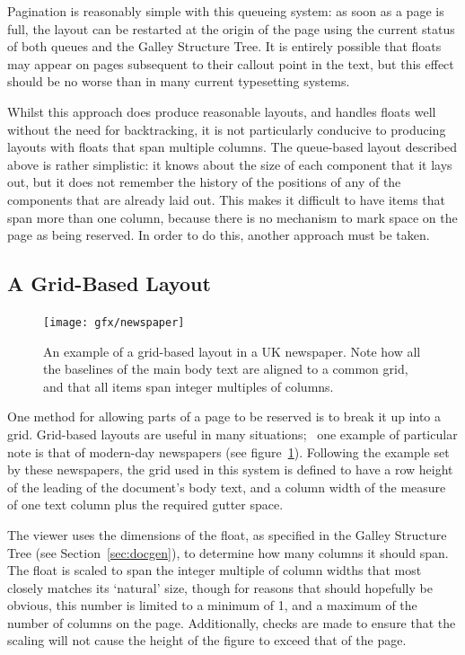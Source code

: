 Pagination is reasonably simple with this queueing system: as soon as a page is full, the layout can be restarted at the origin of the page using the current status of both queues and the Galley Structure Tree. It is entirely possible that floats may appear on pages subsequent to their callout point in the text, but this effect should be no worse than in many current typesetting systems.

Whilst this approach does produce reasonable layouts, and handles floats well without the need for backtracking, it is not particularly conducive to producing layouts with floats that span multiple columns. The queue-based layout described above is rather simplistic: it knows about the size of each component that it lays out, but it does not remember the history of the positions of any of the components that are already laid out. This makes it difficult to have items that span more than one column, because there is no mechanism to mark space on the page as being reserved. In order to do this, another approach must be taken.

\subsection{A Grid-Based Layout}
\label{sec:gridlayout}

\begin{figure}
    \texttt{[image: gfx/newspaper]}
    \caption[An example of a grid-based layout]{An example of a grid-based layout in a UK newspaper. Note how all the baselines of the main body text are aligned to a common grid, and that all items span integer multiples of columns.}
    \label{fig:gridlayout}
\end{figure}

One method for allowing parts of a page to be reserved is to break it up into a grid. Grid-based layouts are useful in many situations;~\cite{Collier1991,Bringhurst2008} one example of particular note is that of modern-day newspapers (see figure~\ref{fig:gridlayout}). Following the example set by these newspapers, the grid used in this system is defined to have a row height of the \gls{leading} of the document's body text, and a column width of the \gls{measure} of one text column plus the required gutter space.



The viewer uses the dimensions of the float, as specified in the Galley Structure Tree (see Section~\ref{sec:docgen}), to determine how many columns it should span. The float is scaled to span the integer multiple of column widths that most closely matches its `natural' size, though for reasons that should hopefully be obvious, this number is limited to a minimum of 1, and a maximum of the number of columns on the page. Additionally, checks are made to ensure that the scaling will not cause the height of the figure to exceed that of the page.

